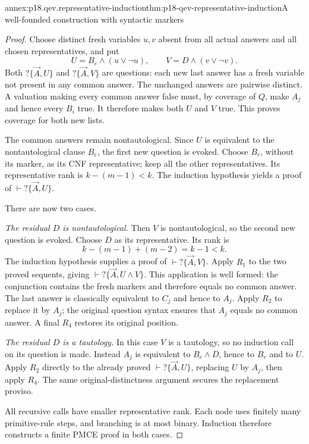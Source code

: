 \begin{annexitem}{annex:p18.qev.representative-induction}{thm:p18-qev-representative-induction}{A well-founded construction with syntactic markers}
\begin{proof}
Choose distinct fresh variables \(u,v\) absent from all actual
answers and all chosen representatives, and put
\[
 U=B_e\land(u\lor\neg u),\qquad
 V=D\land(v\lor\neg v).
\]
Both \(?\{\vec A,U\}\) and \(?\{\vec A,V\}\) are questions:
each new last answer has a fresh variable not present in any common
answer. The unchanged answers are pairwise distinct. A valuation making
every common answer false must, by coverage of \(Q\), make \(A_j\)
and hence every \(B_i\) true. It therefore makes both \(U\)
and \(V\) true. This proves coverage for both new lists.

The common answers remain nontautological. Since \(U\) is equivalent
to the nontautological clause \(B_e\), the first new question is
evoked. Choose \(B_e\), without its marker, as its CNF representative;
keep all the other representatives. Its representative rank is
\(k-(m-1)<k\). The induction hypothesis yields a proof of
\(\vdash?\{\vec A,U\}\).

There are now two cases.

\emph{The residual \(D\) is nontautological.} Then \(V\) is
nontautological, so the second new question is evoked. Choose \(D\)
as its representative. Its rank is
\[
 k-(m-1)+(m-2)=k-1<k.
\]
The induction hypothesis supplies a proof of
\(\vdash?\{\vec A,V\}\). Apply \(R_1\) to the two proved
sequents, giving \(\vdash?\{\vec A,U\land V\}\).
This application is well formed: the conjunction contains the fresh
markers and therefore equals no common answer. The last answer is
classically equivalent to \(C_j\) and hence to \(A_j\).
Apply \(R_2\) to replace it by \(A_j\); the original question
syntax ensures that \(A_j\) equals no common answer. A final
\(R_4\) restores its original position.

\emph{The residual \(D\) is a tautology.} In this case \(V\)
is a tautology, so no induction call on its question is made. Instead
\(A_j\) is equivalent to \(B_e\land D\), hence to \(B_e\)
and to \(U\). Apply \(R_2\) directly to the already proved
\(\vdash?\{\vec A,U\}\), replacing \(U\) by \(A_j\),
then apply \(R_4\). The same original-distinctness argument
secures the replacement proviso.

All recursive calls have smaller representative rank. Each node uses
finitely many primitive-rule steps, and branching is at most binary.
Induction therefore constructs a finite PMCE proof in both cases.
\end{proof}
\end{annexitem}

